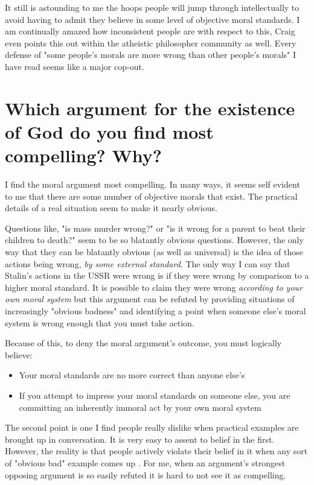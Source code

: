 \documentclass[12pt]{turabian-researchpaper}
\begin{document}
It still is astounding to me the hoops people will jump through intellectually to avoid having to admit they believe in some level of objective moral standards. I am continually amazed how inconsistent people are with respect to this, Craig even points this out within the atheistic philosopher community as well. Every defense of "some people's morals are more wrong than other people's morals" I have read seems like a major cop-out.

\section{Which argument for the existence of God do you find most compelling? Why?}

I find the moral argument most compelling. In many ways, it seems self evident to me that there are some number of objective morals that exist. The practical details of a real situation seem to make it nearly obvious.

Questions like, "is mass murder wrong?" or "is it wrong for a parent to beat their children to death?" seem to be so blatantly obvious questions. However, the only way that they can be blatantly obvious (as well as universal) is the idea of those actions being wrong, \textit{by some external standard}. The only way I can say that Stalin's actions in the USSR were wrong is if they were wrong by comparison to a higher moral standard. It is possible to claim they were wrong \textit{according to your own moral system} but this argument can be refuted by providing situations of increasingly "obvious badness" and identifying a point when someone else's moral system is wrong enough that you must take action.

Because of this, to deny the moral argument's outcome, you must logically believe:

\begin{itemize}
\item Your moral standards are no more correct than anyone else's
\item If you attempt to impress your moral standards on someone else, you are committing an inherently immoral act by your own moral system
\end{itemize}

The second point is one I find people really dislike when practical examples are brought up in conversation. It is very easy to assent to belief in the first. However, the reality is that people actively violate their belief in it when any sort of "obvious bad" example comes up \autocite[pg.180-181]{craig2008reasonable}. For me, when an argument's strongest opposing argument is so easily refuted it is hard to not see it as compelling.
\end{document}
